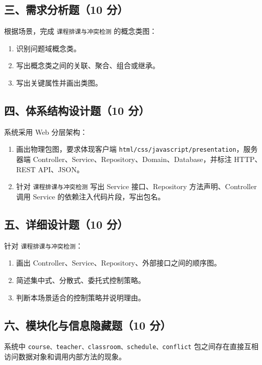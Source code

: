 \documentclass[UTF8,zihao=-4]{ctexart}
\begin{document}
\subsection{三、需求分析题（10 分）}


根据场景，完成 \texttt{课程排课与冲突检测} 的概念类图：


\begin{enumerate}
\item 识别问题域概念类。
\item 写出概念类之间的关联、聚合、组合或继承。
\item 写出关键属性并画出类图。
\end{enumerate}


\subsection{四、体系结构设计题（10 分）}


系统采用 Web 分层架构：


\begin{enumerate}
\item 画出物理包图，要求体现客户端 \texttt{html/css/javascript/presentation}，服务器端 Controller、Service、Repository、Domain、Database，并标注 HTTP、REST API、JSON。
\item 针对 \texttt{课程排课与冲突检测} 写出 Service 接口、Repository 方法声明、Controller 调用 Service 的依赖注入代码片段，写出包名。
\end{enumerate}


\subsection{五、详细设计题（10 分）}


针对 \texttt{课程排课与冲突检测}：


\begin{enumerate}
\item 画出 Controller、Service、Repository、外部接口之间的顺序图。
\item 简述集中式、分散式、委托式控制策略。
\item 判断本场景适合的控制策略并说明理由。
\end{enumerate}


\subsection{六、模块化与信息隐藏题（10 分）}


系统中 \texttt{course、teacher、classroom、schedule、conflict} 包之间存在直接互相访问数据对象和调用内部方法的现象。
\end{document}
